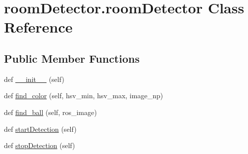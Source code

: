 \hypertarget{classroomDetector_1_1roomDetector}{}\section{room\+Detector.\+room\+Detector Class Reference}
\label{classroomDetector_1_1roomDetector}
\subsection*{Public Member Functions}
\begin{DoxyCompactItemize}
\item 
def \hyperlink{classroomDetector_1_1roomDetector_a1038f6f11c424041c0d9584b6f9c6833}{\+\_\+\+\_\+init\+\_\+\+\_\+} (self)
\item 
def \hyperlink{classroomDetector_1_1roomDetector_a4c27707debecd7e07f55f0e66f460b37}{find\+\_\+color} (self, hsv\+\_\+min, hsv\+\_\+max, image\+\_\+np)
\item 
def \hyperlink{classroomDetector_1_1roomDetector_a6c045c0740ea0cee247c81d20a9d1c91}{find\+\_\+ball} (self, ros\+\_\+image)
\item 
def \hyperlink{classroomDetector_1_1roomDetector_aa8a2aea1db8ce538d11ddb501fae2822}{start\+Detection} (self)
\item 
def \hyperlink{classroomDetector_1_1roomDetector_a1b30655196cae01d824ddeab2bb7e0e3}{stop\+Detection} (self)
\end{DoxyCompactItemize}
